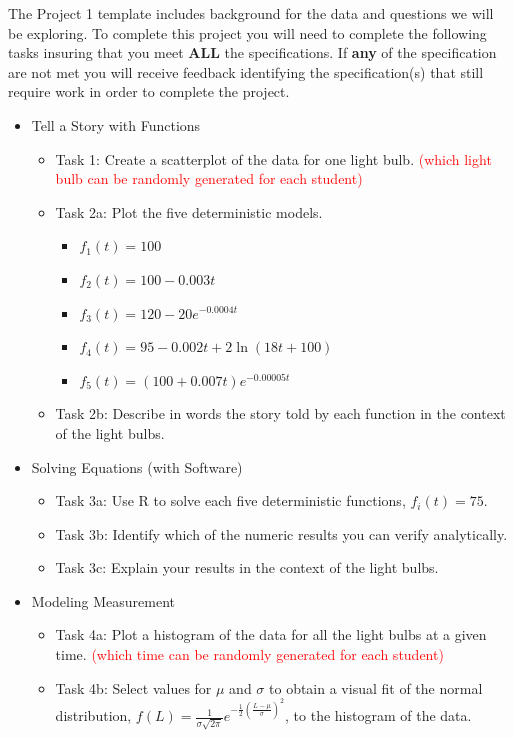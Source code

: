 \documentclass{article}
\theoremstyle{plain}
\theoremstyle{box}
\begin{document}
The Project 1 template includes background for the data and questions we will be exploring. To complete this project you will need to complete the following tasks insuring that you meet \textbf{ALL} the specifications. If \textbf{any} of the specification are not met you will receive feedback identifying the specification(s) that still require work in order to complete the project.

\begin{itemize}
\item Tell a Story with Functions
	\begin{itemize}
	\item Task 1: Create a scatterplot of the data for one light bulb. \textcolor{red}{(which light bulb can be randomly generated for each student)}
	\item Task 2a: Plot the five deterministic models.
		\begin{itemize}
		\item $f_1(t) = 100$
		\item $f_2(t) = 100 - 0.003t$
		\item $f_3(t) = 120 - 20e^{-0.0004t}$
		\item $f_4(t) = 95 - 0.002t + 2\ln(18t+100)$
		\item $f_5(t) = (100+0.007t)e^{-0.00005t}$
		\end{itemize}
	\item Task 2b: Describe in words the story told by each function in the context of the light bulbs.
	\end{itemize}
\item Solving Equations (with Software)
	\begin{itemize}
	\item Task 3a: Use R to solve each five deterministic functions, $f_i(t) = 75$.
	\item Task 3b: Identify which of the numeric results you can verify analytically.
	\item Task 3c: Explain your results in the context of the light bulbs.
	\end{itemize}
\item Modeling Measurement
	\begin{itemize}
	\item Task 4a: Plot a histogram of the data for all the light bulbs at a given time. \textcolor{red}{(which time can be randomly generated for each student)}
	\item Task 4b: Select values for $\mu$ and $\sigma$ to obtain a visual fit of the normal distribution, $f(L) = \frac{1}{\sigma\sqrt{2\pi}}e^{-\frac{1}{2}\left(\frac{L-\mu}{\sigma}\right)^2}$, to the histogram of the data.

\end{itemize}
\end{itemize}
\end{document}
